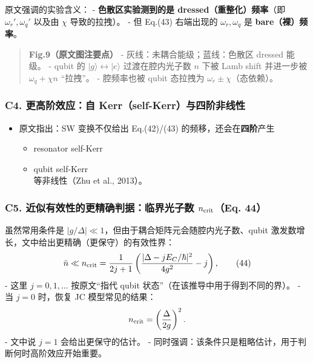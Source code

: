 \documentclass[12pt,a4paper,oneside]{ctexbook}
\providecommand{\tightlist}{%
  \setlength{\itemsep}{0pt}\setlength{\parskip}{0pt}}
\begin{document}
原文强调的实验含义： - \textbf{色散区实验测到的是
dressed（重整化）频率}（即 \(\omega_r',\omega_q'\) 以及由 \(\chi\)
导致的拉拽）。 - 但 Eq.(43) 右端出现的 \(\omega_r,\omega_q\) 是
\textbf{bare（裸）频率}。

\begin{quote}
\textbf{Fig.9（原文图注要点）} - 灰线：未耦合能级；蓝线：色散区 dressed
能级。 - qubit 的 \(|g\rangle\leftrightarrow|e\rangle\) 过渡在腔内光子数
\(n\) 下被 Lamb shift 并进一步被 \(\omega_q+\chi n\) ``拉拽''。 -
腔频率也被 qubit 态拉拽为 \(\omega_r\pm\chi\)（态依赖）。
\end{quote}


\subsubsection{\texorpdfstring{\textbf{C4. 更高阶效应：自
Kerr（self-Kerr）与四阶非线性}}{C4. 更高阶效应：自 Kerr（self-Kerr）与四阶非线性}}\label{c4.-ux66f4ux9ad8ux9636ux6548ux5e94ux81ea-kerrself-kerrux4e0eux56dbux9636ux975eux7ebfux6027}

\begin{itemize}
\tightlist
\item
  原文指出：SW 变换不仅给出 Eq.(42)/(43) 的频移，还会在\textbf{四阶}产生

  \begin{itemize}
  \tightlist
  \item
    resonator self-Kerr\\
  \item
    qubit self-Kerr\\
    等非线性（Zhu et al., 2013）。
  \end{itemize}
\end{itemize}


\subsubsection{\texorpdfstring{\textbf{C5.
近似有效性的更精确判据：临界光子数 \(n_{\rm crit}\)（Eq.
44）}}{C5. 近似有效性的更精确判据：临界光子数 n\_\{\textbackslash{}rm crit\}（Eq. 44）}}\label{c5.-ux8fd1ux4f3cux6709ux6548ux6027ux7684ux66f4ux7cbeux786eux5224ux636eux4e34ux754cux5149ux5b50ux6570-n_rm-criteq.-44}

虽然常用条件是
\(|g/\Delta|\ll 1\)，但由于耦合矩阵元会随腔内光子数、qubit
激发数增长，文中给出更精确（更保守）的有效性界： \[
\bar n \ll n_{\rm crit}
=\frac{1}{2j+1}\left(\frac{|\Delta-jE_C/\hbar|^2}{4g^2}-j\right),
\tag{44}
\] - 这里 \(j=0,1,\dots\) 按原文``指代 qubit
状态''（在该推导中用于得到不同的界）。 - 当 \(j=0\) 时，恢复 JC
模型常见的结果： \[
  n_{\rm crit}=\left(\frac{\Delta}{2g}\right)^2.
  \] - 文中说 \(j=1\) 会给出更保守的估计。 -
同时强调：该条件只是粗略估计，用于判断何时高阶效应开始重要。
\end{document}
